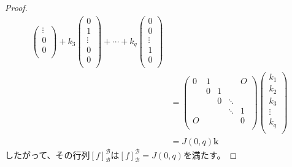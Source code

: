 \documentclass[dvipdfmx]{jsarticle}
\begin{document}
\begin{proof}
\begin{align*}
\begin{pmatrix}
 \vdots \\
0 \\
0 \\
\end{pmatrix} + k_{3}\begin{pmatrix}
0 \\
1 \\
 \vdots \\
0 \\
0 \\
\end{pmatrix} + \cdots + k_{q}\begin{pmatrix}
0 \\
0 \\
 \vdots \\
1 \\
0 \\
\end{pmatrix}\\
&= \begin{pmatrix}
0 & 1 & \  & \  & O \\
\  & 0 & 1 & \  & \  \\
\  & \  & 0 & \ddots & \  \\
\  & \  & \  & \ddots & 1 \\
O & \  & \  & \  & 0 \\
\end{pmatrix}\begin{pmatrix}
k_{1} \\
k_{2} \\
k_{3} \\
 \vdots \\
k_{q} \\
\end{pmatrix}\\
&= J(0,q)\mathbf{k}
\end{align*}
したがって、その行列$[ f]_{\mathcal{B}}^{\mathcal{B}}$は$[ f]_{\mathcal{B}}^{\mathcal{B}} = J(0,q)$を満たす。
\end{proof}
\end{document}
